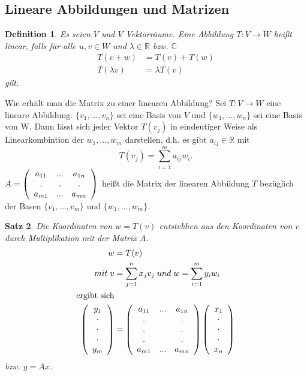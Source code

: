 \documentclass[12pt,a4paper]{report}%
\newtheorem{satz}{Satz}[section]
\newtheorem{definition}[satz]{Definition}
\numberwithin{equation}{section}
\newcommand{\R}{\mathbb{R}} %
\newcommand{\C}{\mathbb{C}}
\def\ccite#1#2{\glqq #1\grqq\cite{#2}}
\def\vecT#1{\left(\begin{array}{c} #1 \end{array}\right)}
\def\dddot{\cdot \\ \cdot \\ \cdot}
\def\vecDt#1#2{\vecT{#1 \\ \dddot \\ #2}}
\numberwithin{equation}{subsection}
\begin{document}
  \subsection{Lineare Abbildungen und Matrizen}
  \begin{definition}
    \ccite{Es seien $V$ und $V$ Vektorräume. Eine Abbildung $T: V\rightarrow W$ heißt linear, falls für alle $u,v \in W$ und $\lambda \in \R$ bzw. $\C$
    \begin{align}
      T(v+w) &= T(v) + T(w)\\
      T(\lambda v) &= \lambda T(v)
    \end{align}
    gilt.}{HM12}
  \end{definition}
  
  Wie erhält man die Matrix zu einer linearen Abbildung?\newline
  \ccite{
    Sei $T:V \rightarrow W$ eine lineare Abbildung. $\lbrace v_1,...,v_n\rbrace$ sei eine Basis von $V$ und $\lbrace w_1,...,w_n\rbrace$ sei eine Basis von W. Dann lässt sich jeder Vektor $T(v_j)$ in eindeutiger Weise als Linearkombintion der $w_1,...,w_m$ darstellen, d.h. es gibt $a_{ij} \in \R$ mit 
    \begin{equation}
      T(v_j) = \sum_{i = 1}^m a_{ij} w_i\text{.}
    \end{equation}
    $
      A = \left( 
      \begin{array}{c c c}
        a_{11} & ... & a_{1n}\\
        .      & .   &.      \\
        a_{m1} & ... & a_{mn}\\
      \end{array}
      \right)
    $
    heißt die Matrix der linearen Abbildung $T$ bezüglich der Basen $\lbrace v_1,...,v_m\rbrace$ und $\lbrace w_1,...,w_m\rbrace$.
  }{HM12}
  
  \begin{satz}
  \ccite{
    Die Koordinaten von $w = T(v)$ entstehhen aus den Koordinaten von $v$ durch Multiplikation mit der Matrix $A$.  
    \begin{align}
      w &= T(v) \nonumber\\ 
      mit \; v &= \sum_{j = 1}^n x_j v_j \; und \; w = \sum_{i = 1}^m y_i w_i \nonumber\\
      \text{ergibt sich} \nonumber\\
      \vecDt{y_1}{y_m} &= 
      \left(\begin{array}{c c c}
        a_{11} & ... & a_{1n} \\
        .      & \;  & .      \\
        .      & \;  & .      \\
        .      & \;  & .      \\
        a_{m1} & ... & a_{mn} \\
      \end{array}\right) 
      \vecDt{x_1}{x_n}
    \end{align}
    bzw. $y = Ax$.
  }{HM12}
  \end{satz}
  
\end{document}
